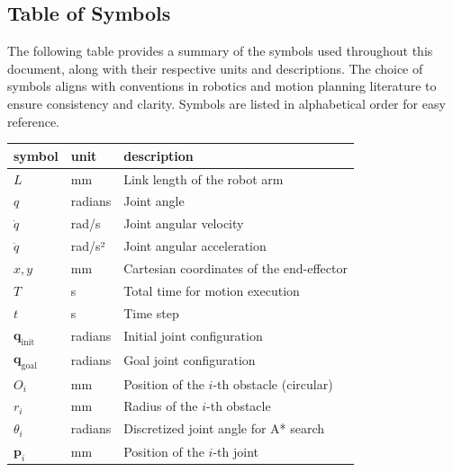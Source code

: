 \documentclass[12pt]{article}
\begin{document}
\subsection{Table of Symbols}

The following table provides a summary of the symbols used throughout this document, along with their respective units and descriptions. The choice of symbols aligns with conventions in robotics and motion planning literature to ensure consistency and clarity. Symbols are listed in alphabetical order for easy reference.

\renewcommand{\arraystretch}{1.2}
\noindent \begin{longtable*}{l l p{12cm}} \toprule
\textbf{symbol} & \textbf{unit} & \textbf{description}\\
\midrule 
\( L \) & \si{\milli\metre} & Link length of the robot arm \\
\( q \) & radians & Joint angle \\
\( \dot{q} \) & rad/s & Joint angular velocity \\
\( \ddot{q} \) & rad/s² & Joint angular acceleration \\
\( x, y \) & \si{\milli\metre} & Cartesian coordinates of the end-effector \\
\( T \) & \si{\second} & Total time for motion execution \\
\( t \) & \si{\second} & Time step \\
\( \mathbf{q}_{\text{init}} \) & radians & Initial joint configuration \\
\( \mathbf{q}_{\text{goal}} \) & radians & Goal joint configuration \\
\( O_i \) & \si{\milli\metre} & Position of the \(i\)-th obstacle (circular) \\
\( r_i \) & \si{\milli\metre} & Radius of the \(i\)-th obstacle \\
\( \theta_i \) & radians & Discretized joint angle for A* search \\
\( \mathbf{p}_i \) & \si{\milli\metre} & Position of the \(i\)-th joint \\

\bottomrule
\end{longtable*}
\end{document}
